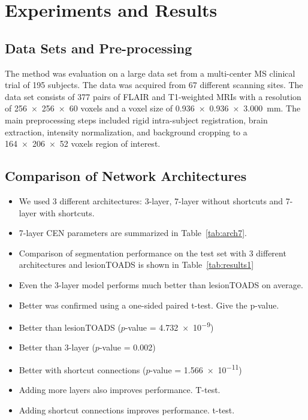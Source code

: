\section{Experiments and Results}


\subsection{Data Sets and Pre-processing}

The method was evaluation on a large data set from a multi-center MS clinical
trial of 195 subjects. The data was acquired from 67 different scanning sites.
The data set consists of 377 pairs of FLAIR and T1-weighted MRIs with a
resolution of \num{256x256x60} voxels and a voxel size of
\SI{0.936x0.936x3.000}{\milli\metre}. The main preprocessing steps included
rigid intra-subject registration, brain extraction, intensity normalization, and
background cropping to a \num{164x206x52} voxels region of interest.

\subsection{Comparison of Network Architectures}

\begin{itemize}
\item We used 3 different architectures: 3-layer, 7-layer without shortcuts and
7-layer with shortcuts.
\item 7-layer CEN parameters are summarized in Table~\ref{tab:arch7}.
\item Comparison of segmentation performance on the test set with 3 different
architectures and lesionTOADS is shown in Table~\ref{tab:results1}
\item Even the 3-layer model performs much better than lesionTOADS on average.
\item Better was confirmed using a one-sided paired t-test. Give the p-value.
\item Better than lesionTOADS ($p$-value = \num{4.732e-9})
\item Better than 3-layer ($p$-value = \num{0.002})
\item Better with shortcut connections ($p$-value = \num{1.566e-11})
\item Adding more layers also improves performance. T-test.
\item Adding shortcut connections improves performance. t-test.
\end{itemize}

